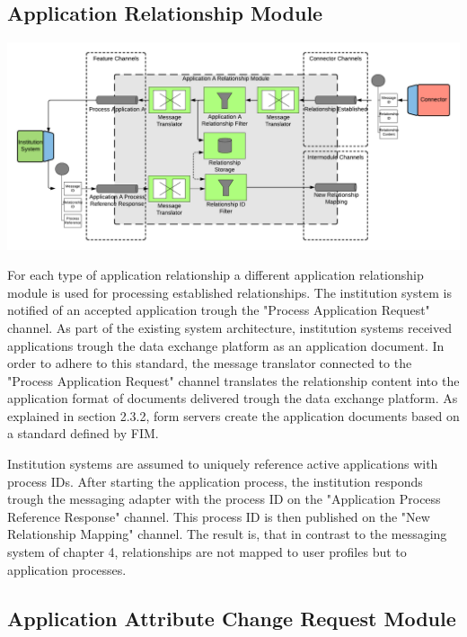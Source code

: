\subsection{Application Relationship Module}

\begin{center}
    \includegraphics[scale=0.5]{Diagrams/Integration Architecture 2/Technological Integration/6. Application Relationship Module.pdf}
\end{center}

For each type of application relationship a different application relationship module is used for processing established relationships. The institution system is notified of an accepted application trough the "Process Application Request" channel. As part of the existing system architecture, institution systems received applications trough the data exchange platform as an application document. In order to adhere to this standard, the message translator connected to the "Process Application Request" channel translates the relationship content into the application format of documents delivered trough the data exchange platform. As explained in section 2.3.2, form servers create the application documents based on a standard defined by FIM.

Institution systems are assumed to uniquely reference active applications with process IDs. After starting the application process, the institution responds trough the messaging adapter with the process ID on the "Application Process Reference Response" channel. This process ID is then published on the "New Relationship Mapping" channel. The result is, that in contrast to the messaging system of chapter 4, relationships are not mapped to user profiles but to application processes.

\subsection{Application Attribute Change Request Module}

